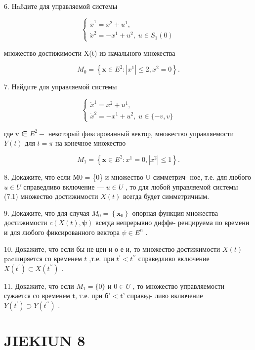 \documentclass[8pt]{extarticle}
\begin{document}
6. Haßдите для управляемой системы

\[
\left\{  \begin{array}{l} {\dot{x}}^{1} = {x}^{2} + {u}^{1}, \\  {\dot{x}}^{2} =  - {x}^{1} + {u}^{2},\;u \in  {S}_{1}\left( 0\right)  \end{array}\right.
\]

множество достижимости X(t) из начального множества

\[
{M}_{0} = \left\{  {\mathbf{x} \in  {E}^{2} : \left| {x}^{1}\right|  \leq  2,{x}^{2} = 0}\right\}  .
\]

7. Найдите для управляемой системы

\[
\left\{  \begin{array}{l} {\dot{x}}^{1} = {x}^{2} + {u}^{1}, \\  {\dot{x}}^{2} =  - {x}^{1} + {u}^{2},\;u \in  \{  - v,v\}  \end{array}\right.
\]

где v ∈ \({E}^{2} -\) некоторый фиксированный вектор, множество управляемости \(Y\left( t\right)\) для \(t = \pi\) на конечное множество

\[
{M}_{1} = \left\{  {\mathbf{x} \in  {E}^{2} : {x}^{1} = 0,\left| {x}^{2}\right|  \leq  1}\right\}  .
\]

8. Докажите, что если М0 = \{0\} и множество U симметрич- ное, т.е. для любого \(u \in  U\) справедливо включение — \(u \in  U\) , то для любой управляемой системы (7.1) множество достижимости \(X\left( t\right)\) всегда будет симметричным.

9. Докажите, что для случая \({M}_{0} = \left\{  {\mathbf{x}}_{0}\right\}\) опорная функция множества достижимости \(c\left( {X\left( t\right) ,\mathbf{\psi }}\right)\) всегда непрерывно диффе- ренцируема по времени и для любого фиксированного вектора \(\psi  \in  {E}^{n}\) .

10. Докажите, что если бы не цен и о е и, то множество достижимости \(X\left( t\right)\) pacширяется со временем \(t\) ,т.е. при \({t}^{\prime } < {t}^{\prime \prime }\) справедливо включение \(X\left( {t}^{\prime }\right)  \subset  X\left( {t}^{\prime \prime }\right)\) .

11. Докажите, что если \({M}_{1} = \{ 0\}\) и \(0 \in  U\) , то множество управляемости сужается со временем t, т.е. при б’ < t’ справед- ливо включение \(Y\left( {t}^{\prime }\right)  \supset  Y\left( {t}^{\prime \prime }\right)\) .

\section*{JIEKIUN 8}
\end{document}
